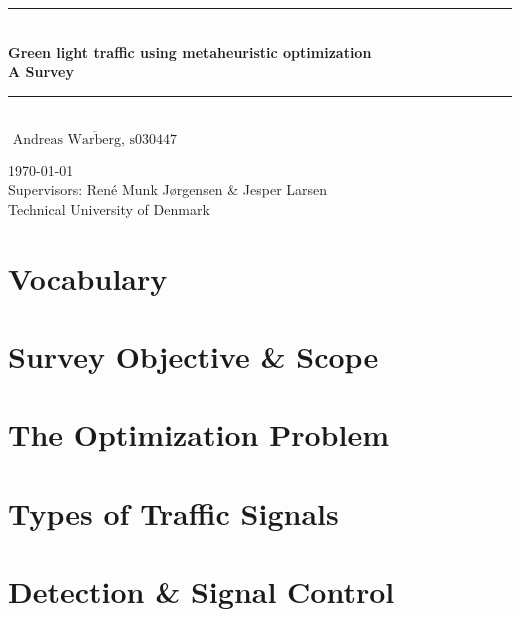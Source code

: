\documentclass [a4paper, 11pt, titlepage] {article}
\date{A date}
\begin{document}
\setlength{\parindent}{4mm}

\begin{titlepage}
  \begin{center}
    \noindent\rule{\linewidth}{1mm}\\[4mm]
      {\sffamily\bfseries \Huge Green light traffic using metaheuristic optimization}\\[1mm]
      {\sffamily\bfseries \Large
        A Survey}\\[0mm]
    \noindent\rule{\linewidth}{1mm}\\[30mm]
    \large $\overline{\textrm{ Andreas Warberg, s030447 }}$


    \large \today \\[6mm]
    Supervisors: Ren\'{e} Munk Jørgensen \& Jesper Larsen \\[3mm]
    Technical University of Denmark
  \end{center}
\end{titlepage}

\newpage
{}
\tableofcontents
\newpage
{}



\newpage

\section{Vocabulary}


\section{Survey Objective \& Scope}


\section{The Optimization Problem}


\section{Types of Traffic Signals}


\section{Detection \& Signal Control}

\end{document}
